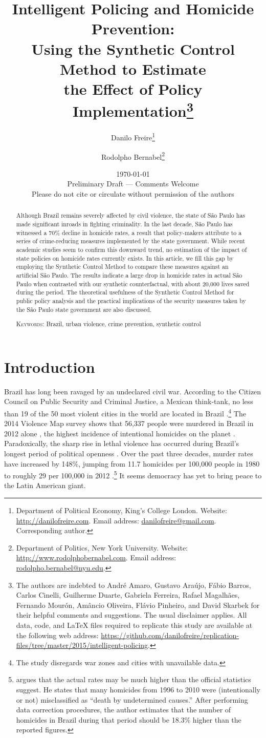 \documentclass[a4paper,11pt]{article}
\title{Intelligent Policing and Homicide Prevention:\\ Using the Synthetic Control Method to Estimate\\ the Effect of Policy Implementation\thanks{The authors are indebted to Andr\'{e} Amaro, Gustavo Ara\'{u}jo, F\'{a}bio Barros, Carlos Cinelli, Guilherme Duarte, Gabriela Ferreira, Rafael Magalh\~{a}es, Fernando Mour\'{o}n, Am\^{a}ncio Oliveira, Fl\'{a}vio Pinheiro, and David Skarbek for their helpful comments and suggestions. The usual disclaimer applies. All data, code, and \LaTeX \hspace{.001cm} files required to replicate this study are available at the following web address: \href{https://github.com/danilofreire/replication-files/tree/master/2015/intelligent-policing}{https://github.com/danilofreire/replication-files/tree/master/2015/intelligent-policing}.}}
\author{
Danilo Freire\thanks{Department of Political Economy, King's College London. Website: \href{http://danilofreire.com}{http://danilofreire.com}. Email address: \href{mailto:danilofreire@gmail.com}{danilofreire@gmail.com}. Corresponding author.}
\and Rodolpho Bernabel\thanks{Department of Politics, New York University. Website: \href{http://www.rodolphobernabel.com}{http://www.rodolphobernabel.com}. Email address: \href{mailto:rodolpho.bernabel@nyu.edu}{rodolpho.bernabel@nyu.edu}.}
}
\date{\today\\
\vspace{2cm}
Preliminary Draft --- Comments Welcome\\
\vspace{.25cm}
Please do not cite or circulate without permission of the authors
}
\begin{document}
\maketitle

\begin{abstract}

\onehalfspacing

Although Brazil remains severely affected by civil violence, the state of S\~{a}o Paulo has made significant inroads in fighting criminality. In the last decade, S\~{a}o Paulo has witnessed a 70\% decline in homicide rates, a result that policy-makers attribute to a series of crime-reducing measures implemented by the state government. While recent academic studies seem to confirm this downward trend, no estimation of the impact of state policies on homicide rates currently exists. In this article, we fill this gap by employing the Synthetic Control Method to compare these measures against an artificial S\~{a}o Paulo. The results indicate a large drop in homicide rates in actual S\~{a}o Paulo when contrasted with our synthetic counterfactual, with about 20,000 lives saved during the period. The theoretical usefulness of the Synthetic Control Method for public policy analysis and the practical implications of the security measures taken by the S\~{a}o Paulo state government are also discussed.

\vspace{.5cm}
\noindent
\textsc{Keywords}: Brazil, urban violence, crime prevention, synthetic control
\end{abstract}

\newpage

\section{Introduction}

\doublespacing

Brazil has long been ravaged by an undeclared civil war. According to the Citizen Council on Public Security and Criminal Justice, a Mexican think-tank, no less than 19 of the 50 most violent cities in the world are located in Brazil \citep{mexico2014}.\footnote{The study disregards war zones and cities with unavailable data.} The 2014 Violence Map survey shows that 56,337 people were murdered in Brazil in 2012 alone \citep{mapa2014}, the highest incidence of intentional homicides on the planet \citep{unodc2013}. Paradoxically, the sharp rise in lethal violence has occurred during Brazil's longest period of political openness \citep{ahnen2003, pinheiro2000, pinheiro2001}. Over the past three decades, murder rates have increased by 148\%, jumping from 11.7 homicides per 100,000 people in 1980 to roughly 29 per 100,000 in 2012 \citep{mapa2014}.\footnote{\citet{cerqueira2013} argues that the actual rates may be much higher than the official statistics suggest. He states that many homicides from 1996 to 2010 were (intentionally or not) misclassified as ``death by undetermined causes.'' After performing data correction procedures, the author estimates that the number of homicides in Brazil during that period should be 18.3\% higher than the reported figures.}  It seems democracy has yet to bring peace to the Latin American giant.
\end{document}

